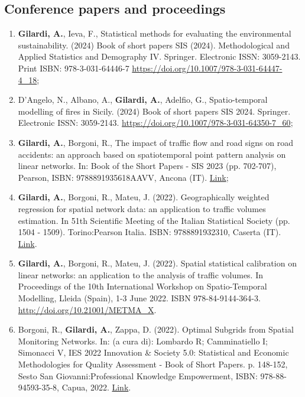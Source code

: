 \documentclass[11pt,a4paper,sans]{moderncv}
\begin{document}
  \subsection{Conference papers and proceedings}
  	\begin{enumerate}
  	\item \textbf{Gilardi, A.}, Ieva, F., Statistical methods for evaluating the environmental sustainability. (2024) Book of short papers SIS (2024). Methodological and Applied Statistics and Demography IV. Springer. Electronic ISSN: 3059-2143. Print ISBN: 978-3-031-64446-7 \url{https://doi.org/10.1007/978-3-031-64447-4_18}; 
  	\item D'Angelo, N., Albano, A., \textbf{Gilardi, A.}, Adelfio, G., Spatio-temporal modelling of fires in Sicily. (2024) Book of short papers SIS 2024. Springer. Electronic ISSN: 3059-2143. \url{https://doi.org/10.1007/978-3-031-64350-7_60};
  	\item \textbf{Gilardi, A.}, Borgoni, R., The impact of traffic flow and road signs on road accidents: an approach based on spatiotemporal point pattern analysis on linear networks. In: Book of the Short Papers - SIS 2023 (pp. 702-707), Pearson, ISBN: 9788891935618AAVV, Ancona (IT). \href{https://it.pearson.com/content/dam/region-core/italy/pearson-italy/pdf/Docenti/Universit%C3%A0/bozza-book-compresso.pdf}{Link}; 
  	\item \textbf{Gilardi, A.}, Borgoni, R., Mateu, J. (2022). Geographically weighted regression for spatial network data: an application to traffic volumes estimation. In 51th Scientific Meeting of the Italian Statistical Society (pp. 1504 - 1509). Torino:Pearson Italia. ISBN: 9788891932310, Caserta (IT). \href{https://it.pearson.com/content/dam/region-core/italy/pearson-italy/pdf/Docenti/Universit%C3%A0/Sis-2022-4c-low.pdf}{Link}.
  	\item \textbf{Gilardi, A.}, Borgoni, R., Mateu, J. (2022). Spatial statistical calibration on linear networks: an application to the analysis of traffic volumes. In Proceedings of the 10th International Workshop on Spatio-Temporal Modelling, Lleida (Spain), 1-3 June 2022. ISBN 978-84-9144-364-3. \url{http://doi.org/10.21001/METMA\_X}.
  	\item Borgoni, R., \textbf{Gilardi, A.}, Zappa, D. (2022). Optimal Subgrids from Spatial Monitoring Networks. In: (a cura di): Lombardo R; Camminatiello I; Simonacci V, IES 2022 Innovation \& Society 5.0: Statistical and Economic Methodologies for Quality Assessment - Book of Short Papers. p. 148-152, Sesto San Giovanni:Professional Knowledge Empowerment, ISBN: 978-88-94593-35-8, Capua, 2022.  \href{https://drive.google.com/file/d/1HEZG50lecMyx_NDRLi2Y7d0papiX9ZWO/view}{Link}.

\end{enumerate}
\end{document}
